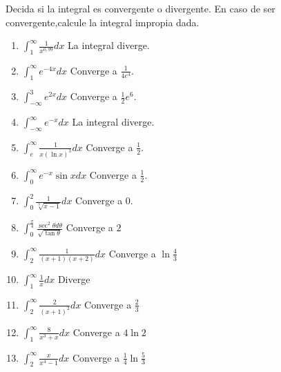 \begin{ejer}{Decida si la integral es convergente o divergente. En caso de ser convergente,calcule la integral impropia dada.}
\end{ejer}
\begin{enumerate}
	
\item {$\displaystyle\int_{1}^{\infty }\frac{1}{x^{0,99}}dx$} {La integral diverge.}

\item {$\displaystyle\int_{1}^{\infty }e^{-4x}dx$} {Converge a $\frac{1}{4e^{4}}$.}

\item {$\displaystyle\int_{-\infty }^{3}e^{2x}dx$} {Converge a $\frac{1}{2}e^{6}$.}

\item {$\displaystyle\int_{-\infty }^{\infty }e^{-x}dx$} {La integral diverge.}

\item {$\displaystyle\int_{e}^{\infty }\frac{1}{x\left( \ln x\right) ^{3}}dx$} {Converge a $\frac{1}{2}$.}

\item {$\displaystyle\int_{0}^{\infty }e^{-x}\sin xdx$} {Converge a $\frac{1}{2}$.}

\item {$\displaystyle\int_{0}^{2}\frac{1}{\sqrt[3]{x-1}}dx$} {Converge a $0$.}

\item {$\displaystyle\int_{0}^{\frac{\pi }{4}}\frac{\sec ^{2}\theta d\theta }{\sqrt{\tan\theta }}$} {Converge a $2$}

\item {$\displaystyle \int_{2}^{\infty }\frac{1}{\left( x+1\right) \left( x+2\right) }dx$} {Converge a $\ln \frac{4}{3}$}

\item {$\displaystyle\int_{1}^{\infty }\frac{1}{x}dx$} {Diverge}

\item {$\displaystyle\int_{2}^{\infty }\frac{2}{\left( x+1\right) ^{2}}dx$} {Converge a $\frac{2}{3}$}

\item {$\displaystyle\int_{1}^{\infty }\frac{8}{x^{3}+x}dx$} {Converge a $4\ln 2$}

\item {$\displaystyle\int_{2}^{\infty }\frac{x}{x^{4}-1}dx$} {Converge a $\frac{1}{4}\ln \frac{5}{3}$}


\end{enumerate}
